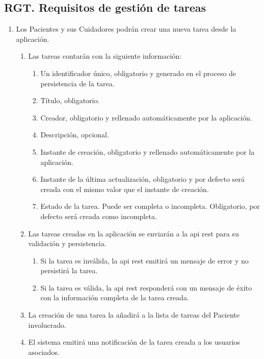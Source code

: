 \subsection{RGT. Requisitos de gestión de tareas}

\begin{enumerate}[label*=RGT \arabic*.]
    \item \label{req:crear_tarea} Los Pacientes y sus Cuidadores podrán crear una nueva tarea desde la aplicación.
    \begin{enumerate}[label*=\arabic*.]
        \item Las tareas contarán con la siguiente información:
        \begin{enumerate}[label*=\arabic*.]
            \item Un identificador único, obligatorio y generado en el proceso de persistencia de la tarea.
            \item Título, obligatorio.
            \item Creador, obligatorio y rellenado automáticamente por la aplicación.
            \item Descripción, opcional.
            \item Instante de creación, obligatorio y rellenado automáticamente por la aplicación.
            \item Instante de la última actualización, obligatorio y por defecto será creada con el mismo valor que el instante de creación.
            \item Estado de la tarea. Puede ser completa o incompleta. Obligatorio, por defecto será creada como incompleta.
        \end{enumerate}
        \item Las tareas creadas en la aplicación se enviarán a la \acrshort{api} \acrshort{rest} para su validación y persistencia.
        \begin{enumerate}[label*=\arabic*.]
            \item Si la tarea es inválida, la \acrshort{api} \acrshort{rest} emitirá un mensaje de error y no persistirá la tarea.
            \item Si la tarea es válida, la \acrshort{api} \acrshort{rest} responderá con un mensaje de éxito con la información completa de la tarea creada.
        \end{enumerate}
        \item La creación de una tarea la añadirá a la lista de tareas del Paciente involucrado.
        \item \label{req:noti_nueva_tarea} El sistema emitirá una notificación de la tarea creada a los usuarios asociados.

\end{enumerate}
\end{enumerate}
